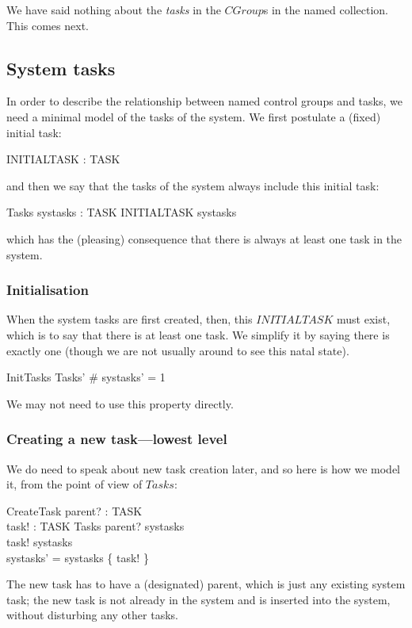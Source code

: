 \documentclass[a4paper,twoside,12pt]{article}
\begin{document}
We have said nothing about the \emph{tasks} in the $CGroup$s in the named collection.
This comes next.

\subsection{System tasks}
In order to describe the relationship between named control groups and tasks, we need a minimal model of the tasks of the system. We first postulate a (fixed) initial task:

\begin{axdef}{}
INITIALTASK : TASK
\end{axdef}
and then we say that the tasks of the system always include this initial task:

\begin{schema}{Tasks}
systasks : \finset TASK
\where
INITIALTASK \in systasks
\end{schema}
which has the (pleasing) consequence that there is always at least one task in the system.

\subsubsection{Initialisation}

When the system tasks are first created, then, this $INITIALTASK$ must exist, which is to say that there is at least one task. We simplify it by saying there is exactly one (though we are not usually around to see this natal state).

\begin{schema}{InitTasks}
Tasks'
\where
\# systasks' = 1
\end{schema}
We may not need to use this property directly.

\subsubsection{Creating a new task---lowest level}

We do need to speak about new task creation later, and so here is how we model it, from the point of view of $Tasks$:

\begin{schema}{CreateTask}
parent? : TASK \\
task! : TASK
\also
\Delta Tasks
\where
parent? \in systasks \\
task! \notin systasks \\
systasks' = systasks \cup \{ task! \}
\end{schema}
The new task has to have a (designated) parent, which is just any existing system task; the new task is not already
in the system and is inserted into the system, without disturbing any other tasks.
\end{document}
